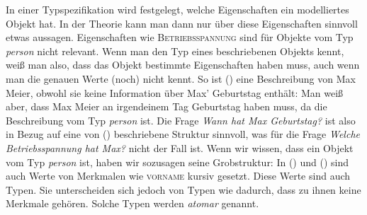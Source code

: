 In einer Typspezifikation wird festgelegt, welche Eigenschaften ein modelliertes
Objekt hat. In der Theorie kann man dann nur über diese Eigenschaften sinnvoll etwas
aussagen. Eigenschaften wie \textsc{Betriebsspannung} sind für Objekte vom
Typ \textit{person} nicht relevant. Wenn man den Typ eines beschriebenen Objekts kennt,
weiß man also, dass das Objekt bestimmte Eigenschaften haben muss, auch wenn man
die genauen Werte (noch) nicht kennt. So ist () eine Beschreibung von
Max Meier, obwohl sie \zb keine Information über Max' Geburtstag enthält:
\ea
{}
\z
Man weiß aber, dass Max Meier an irgendeinem Tag Geburtstag haben muss, da die
Beschreibung vom Typ \textit{person} ist. Die Frage \emph{Wann hat Max Geburtstag?}
ist also in Bezug auf eine von () beschriebene Struktur sinnvoll, was für die Frage
\emph{Welche Betriebsspannung hat Max?} nicht der Fall ist. Wenn wir wissen, dass ein Objekt vom Typ
\textit{person} ist, haben wir sozusagen seine Grobstruktur:
\ea
{}
\z
In () und () sind auch Werte von Merkmalen wie \textsc{vorname} kursiv gesetzt. Diese Werte sind auch
Typen. Sie unterscheiden sich jedoch von Typen wie  dadurch, dass zu ihnen keine
Merkmale gehören. Solche Typen werden \emph{atomar} genannt.
\largerpage[2]

